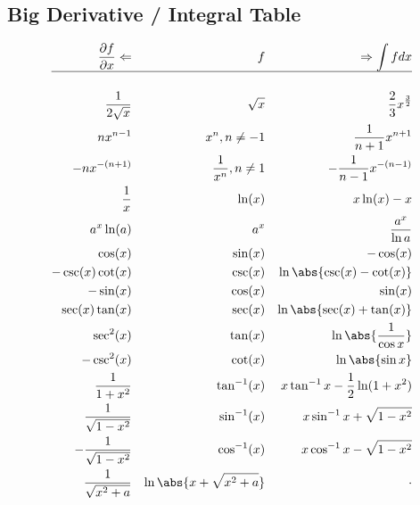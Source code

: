 \hypertarget{big-derivative-integral-table}{%
\subsection{Big Derivative / Integral
Table}\label{big-derivative-integral-table}}

\begin{align*}
\frac{\partial f}{\partial{x}}\Leftarrow && f                           && \Rightarrow\int f dx   \\
\hline \\
\frac{1}{2\sqrt{x}}                      && \sqrt{x}                    && \frac{2}{3}x^{\frac{3}{2}} \\
nx^{n-1}                                 && x^n, n \neq -1              && \frac{1}{n+1}x^{n+1} \\
-nx^{-(n+1)}                             && \frac{1}{x^n}, n \neq 1     && -\frac{1}{n-1}x^{-(n-1)} \\
\frac{1}{x}                              && {\ln(x)}       && x\ln(x) - x \\
a^x\ln(a)                                && a^x                         && \frac{a^x}{\ln a} \\
\cos(x)                                  && \sin(x)                     && -\cos(x) \\
-\csc(x)\cot(x)                          && \csc(x)                     && \ln\abs{\csc(x)-\cot(x)} \\
-\sin(x)                                 && \cos(x)                     && \sin(x) \\
\sec(x)\tan(x)                           && \sec(x)                     && \ln\abs{\sec(x) + \tan(x)} \\
\sec^2(x)                                && \tan(x)                     && \ln\abs{\frac{1}{\cos x}} \\
-\csc^2(x)                               && \cot(x)                     && \ln \abs{\sin x} \\
\frac{1}{1+x^2}                          && {\tan^{-1}(x)} && x\tan^{-1}x - \frac{1}{2}\ln(1+x^2) \\
\frac{1}{\sqrt{1-x^2}}                   && {\sin^{-1}(x)} && x\sin^{-1}x+ \sqrt{1-x^2} \\
-\frac{1}{\sqrt{1-x^2}}                  && {\cos^{-1}(x)} && x\cos^{-1}x -\sqrt{1-x^2} \\
\frac{1}{\sqrt{x^2+a}}                   && \ln\abs{x+\sqrt{x^2+a}}     && \cdot\\

\end{align*}
